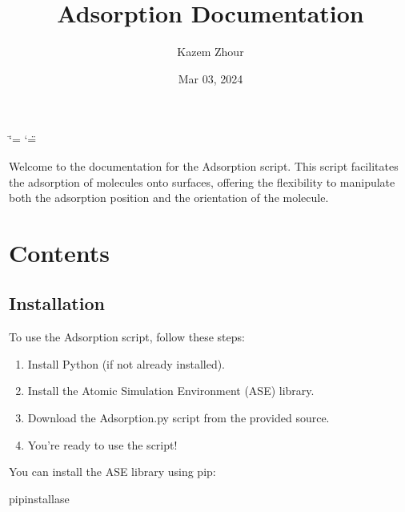 \documentclass[letterpaper,10pt,english]{sphinxmanual}
\title{Adsorption Documentation}
\date{Mar 03, 2024}
\author{Kazem Zhour}
\begin{document}
\ifdefined\shorthandoff
  \ifnum\catcode`\=\string=\active\shorthandoff{=}\fi
  \ifnum\catcode`\"=\active{}\fi
\fi

\pagestyle{empty}
\sphinxmaketitle
\pagestyle{plain}
\sphinxtableofcontents
\pagestyle{normal}
\label{\detokenize{index::doc}}



\sphinxAtStartPar
Welcome to the documentation for the Adsorption script. This script facilitates the adsorption of molecules onto surfaces, offering the flexibility to manipulate both the adsorption position and the orientation of the molecule.


\chapter{Contents}
\label{\detokenize{index:contents}}
\sphinxstepscope


\section{Installation}
\label{\detokenize{installation:installation}}\label{\detokenize{installation::doc}}
\sphinxAtStartPar
To use the Adsorption script, follow these steps:
\begin{enumerate}
%
\item {} 
\sphinxAtStartPar
Install Python (if not already installed).

\item {} 
\sphinxAtStartPar
Install the Atomic Simulation Environment (ASE) library.

\item {} 
\sphinxAtStartPar
Download the Adsorption.py script from the provided source.

\item {} 
\sphinxAtStartPar
You’re ready to use the script!

\end{enumerate}

\sphinxAtStartPar
You can install the ASE library using pip:

\begin{sphinxVerbatim}[commandchars=\\\{\}]
pipinstallase
\end{sphinxVerbatim}
\end{document}
